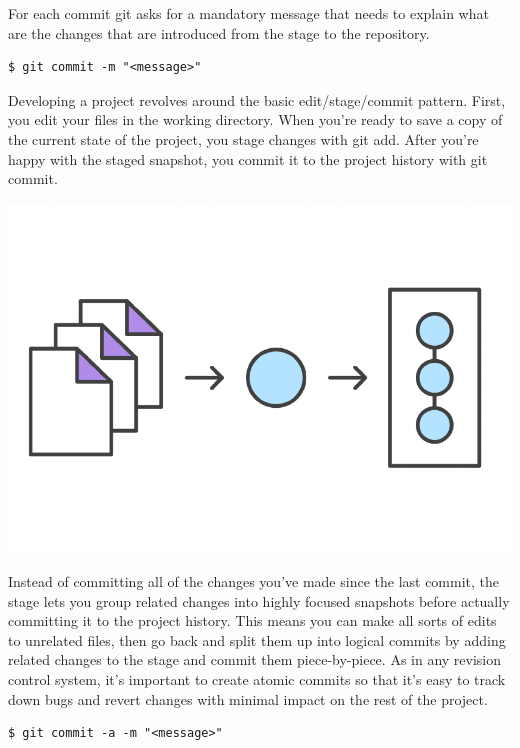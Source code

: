 \documentclass{article}
\begin{document}
For each commit git asks for a mandatory message that needs to explain
what are the changes that are introduced from the stage to the repository. 

\begin{lstlisting}
$ git commit -m "<message>"
\end{lstlisting}

Developing a project revolves around the basic edit/stage/commit
pattern. First, you edit your files in the working directory. When
you're ready to save a copy of the current state of the project, you
stage changes with git add. After you're happy with the staged
snapshot, you commit it to the project history with git commit. 

\begin{center}
\includegraphics[scale=0.5]{figures/04.pdf}
\end{center}

Instead of committing all of the changes you've made since the last
commit, the stage lets you group related changes into highly focused
snapshots before actually committing it to the project history. This
means you can make all sorts of edits to unrelated files, then go back
and split them up into logical commits by adding related changes to
the stage and commit them piece-by-piece. As in any revision control
system, it's important to create atomic commits so that it's easy to
track down bugs and revert changes with minimal impact on the rest of
the project. 

\begin{lstlisting}
$ git commit -a -m "<message>"
\end{lstlisting}
\end{document}
